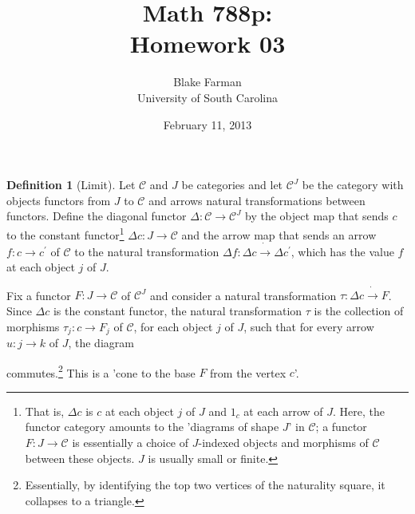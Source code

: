 \documentclass[10pt]{amsart}
\author{Blake Farman\\University of South Carolina}
\title{Math 788p:\\Homework 03}
\date{February 11, 2013}
\begin{document}
\maketitle

\providecommand{\p}{\mathfrak{p}}
\providecommand{\m}{\mathfrak{m}}

\theoremstyle{plain}
\newtheorem{thm}{}
\newtheorem{lem}{Lemma}
\theoremstyle{definition}
\newtheorem{defn}{Definition}

\setcounter{thm}{2}

\begin{defn}[Limit]\label{def1}
  Let $\mathcal{C}$ and $J$ be categories and let $\mathcal{C}^{J}$ be the category with objects functors from $J$ to $\mathcal{C}$ and arrows natural transformations between functors.
  Define the diagonal functor $\Delta \colon \mathcal{C} \rightarrow \mathcal{C}^{J}$ by the object map that sends $c$ to the
  constant functor\footnote{That is, $\Delta c$ is $c$ at each object $j$ of $J$ and $1_c$ at each arrow of $J$.  
    Here, the functor category amounts to the 'diagrams of shape $J$' in $\mathcal{C}$; a functor $F \colon J \rightarrow \mathcal{C}$ is essentially a choice of $J$-indexed objects and morphisms of $\mathcal{C}$ between these objects.
  $J$ is usually small or finite.} 
  $\Delta c: J \rightarrow \mathcal{C}$ and the arrow map that sends an arrow $f: c \rightarrow c^\prime$ of $\mathcal{C}$ to the natural 
  transformation $\Delta f: \Delta c \dot{\rightarrow} \Delta c^\prime$, which has the value $f$ at each object $j$ of $J$.

  Fix a functor $F \colon J \rightarrow \mathcal{C}$ of $\mathcal{C}^{J}$ and consider a natural transformation $\tau \colon \Delta c \dot{\rightarrow} F$.
  Since $\Delta c$ is the constant functor, the natural transformation $\tau$ is the collection of morphisms $\tau_j \colon c \rightarrow F_j$ of $\mathcal{C}$, for each object $j$ of $J$, such that for every arrow $u \colon j \rightarrow k$ of $J$, the diagram 
    \begin{center}
    \end{center}
    commutes.\footnote{Essentially, by identifying the top two vertices of the naturality square, it collapses to a triangle.}
    This is a 'cone to the base $F$ from the vertex $c$'.
    

\end{defn}
\end{document}
